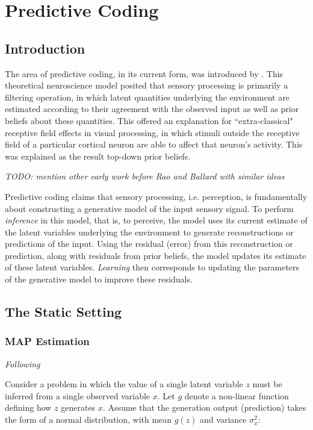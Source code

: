 \chapter{Predictive Coding}

\section{Introduction}

The area of predictive coding, in its current form, was introduced by \cite{rao1999predictive}. This theoretical neuroscience model posited that sensory processing is primarily a filtering operation, in which latent quantities underlying the environment are estimated according to their agreement with the observed input as well as prior beliefs about these quantities. This offered an explanation for ``extra-classical" receptive field effects in visual processing, in which stimuli outside the receptive field of a particular cortical neuron are able to affect that neuron's activity. This was explained as the result top-down prior beliefs.

\textit{TODO: mention other early work before Rao and Ballard with similar ideas}

Predictive coding claims that sensory processing, i.e. perception, is fundamentally about constructing a generative model of the input sensory signal. To perform \textit{inference} in this model, that is, to perceive, the model uses its current estimate of the latent variables underlying the environment to generate reconstructions or predictions of the input. Using the residual (error) from this reconstruction or prediction, along with residuals from prior beliefs, the model updates its estimate of these latent variables. \textit{Learning} then corresponds to updating the parameters of the generative model to improve these residuals.

\section{The Static Setting}

\subsection{MAP Estimation}

\textit{Following \cite{bogacz2017tutorial}}
\newline

Consider a problem in which the value of a single latent variable $z$ must be inferred from a single observed variable $x$. Let $g$ denote a non-linear function defining how $z$ generates $x$. Assume that the generation output (prediction) takes the form of a normal distribution, with mean $g(z)$ and variance $\sigma^2_x$:

